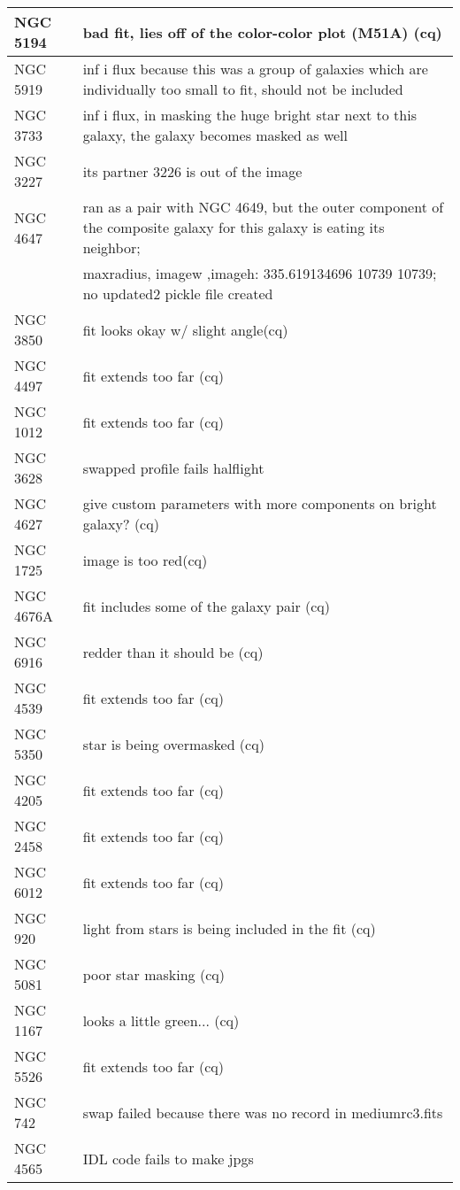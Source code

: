 \documentclass[10pt]{article}
\begin{document}
\begin{landscape}
\begin{longtable}{|l|l|}
NGC 5194 & bad fit, lies off of the color-color plot (M51A) (cq) \\ \hline
NGC 5919 &inf i flux because this was a group of galaxies which are individually too small to fit, should not be included \\ \hline
NGC 3733 & inf i flux, in masking the huge bright star next to this galaxy, the galaxy becomes masked as well \\ \hline
NGC 3227 & its partner 3226 is out of the image\\ \hline
NGC 4647 & ran as a pair with NGC 4649, but the outer component of the composite galaxy for this galaxy is eating its neighbor;\\ \hline
 & maxradius, imagew ,imageh: 335.619134696 10739 10739; no updated2 pickle file created \\ \hline
NGC 3850 & fit looks okay w/ slight angle(cq)\\ \hline
NGC 4497 & fit extends too far (cq)\\ \hline
NGC 1012 & fit extends too far (cq)\\ \hline
NGC 3628 & swapped profile fails halflight\\ \hline
NGC 4627 & give custom parameters with more components on bright galaxy? (cq) \\ \hline
NGC 1725 & image is too red(cq) \\ \hline
NGC 4676A & fit includes some of the galaxy pair (cq) \\ \hline
NGC 6916 & redder than it should be (cq) \\ \hline
NGC 4539 & fit extends too far (cq) \\ \hline
NGC 5350 & star is being overmasked (cq) \\ \hline
NGC 4205 & fit extends too far (cq)\\ \hline
NGC 2458 & fit extends too far (cq)\\ \hline
NGC 6012 & fit extends too far (cq)\\ \hline
NGC 920 & light from stars is being included in the fit (cq)\\ \hline
NGC 5081 & poor star masking (cq)\\ \hline
NGC 1167 & looks a little green... (cq)\\ \hline
NGC 5526 & fit extends too far (cq)\\ \hline
NGC 742 & swap failed because there was no record in mediumrc3.fits \\ \hline
NGC 4565 & IDL code fails to make jpgs \\ \hline

\end{longtable}
\end{landscape}
\end{document}
